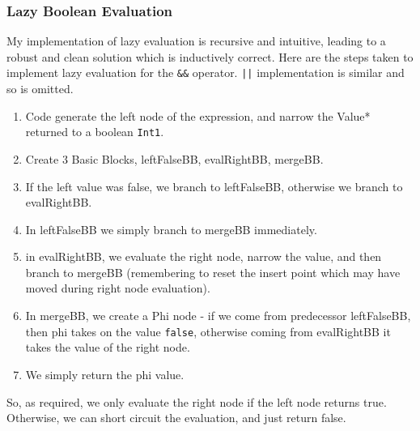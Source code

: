 \documentclass[10pt,a4paper]{article}
\newcommand{\code}[1]{\lstinline!#1!}
\begin{document}
\subsubsection*{Lazy Boolean Evaluation}
My implementation of lazy evaluation is recursive and intuitive, leading to a robust and clean solution which is inductively correct. Here are the steps taken to implement lazy evaluation for the \code{&&} operator. \code{||} implementation is similar and so is omitted.
\begin{enumerate}
    \item Code generate the left node of the expression, and narrow the Value* returned to a boolean \code{Int1}.
    \item Create 3 Basic Blocks, leftFalseBB, evalRightBB, mergeBB.
    \item If the left value was false, we branch to leftFalseBB, otherwise we branch to evalRightBB.
    \item In leftFalseBB we simply branch to mergeBB immediately.
    \item in evalRightBB, we evaluate the right node, narrow the value, and then branch to mergeBB (remembering to reset the insert point which may have moved during right node evaluation).
    \item In mergeBB, we create a Phi node - if we come from predecessor leftFalseBB, then phi takes on the value \code{false}, otherwise coming from evalRightBB it takes the value of the right node.
    \item We simply return the phi value.
\end{enumerate}
So, as required, we only evaluate the right node if the left node returns true. Otherwise, we can short circuit the evaluation, and just return false.

\newpage




\newpage
\end{document}

